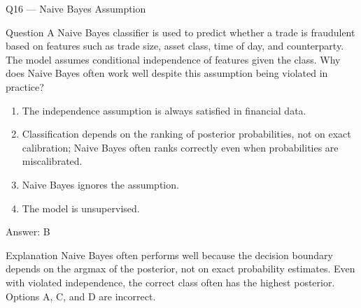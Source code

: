 \documentclass[aspectratio=169,8pt]{beamer}
\begin{document}
	\begin{frame}{Q16 --- Naive Bayes Assumption}
		\begin{block}{Question}
			A Naive Bayes classifier is used to predict whether a trade is fraudulent based on features such as trade size, asset class, time of day, and counterparty. The model assumes conditional independence of features given the class. Why does Naive Bayes often work well despite this assumption being violated in practice?
			\begin{enumerate}
				\item The independence assumption is always satisfied in financial data.
				\item Classification depends on the ranking of posterior probabilities, not on exact calibration; Naive Bayes often ranks correctly even when probabilities are miscalibrated.
				\item Naive Bayes ignores the assumption.
				\item The model is unsupervised.
			\end{enumerate}
		\end{block}
		\begin{exampleblock}{Answer: B}\end{exampleblock}
		\begin{block}{Explanation}
			Naive Bayes often performs well because the decision boundary depends on the argmax of the posterior, not on exact probability estimates. Even with violated independence, the correct class often has the highest posterior. Options A, C, and D are incorrect.
		\end{block}
	\end{frame}
	
\end{document}

